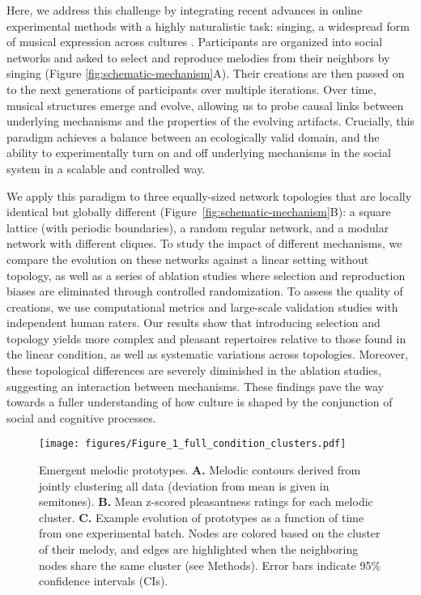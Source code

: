 \documentclass[10pt,letterpaper]{article}
\begin{document}
Here, we address this challenge by integrating recent advances in online experimental methods \cite{HarrisonMarjieh2020,anglada2023large} with a highly naturalistic task: singing, a widespread form of musical expression across cultures \cite{mehr2019universality}. Participants are organized into social networks and asked to select and reproduce melodies from their neighbors by singing (Figure \ref{fig:schematic-mechanism}A). Their creations are then passed on to the next generations of participants over multiple iterations. Over time, musical structures emerge and evolve, allowing us to probe causal links between underlying mechanisms and the properties of the evolving artifacts. Crucially, this paradigm achieves a balance between an ecologically valid domain, and the ability to experimentally turn on and off underlying mechanisms in the social system in a scalable and controlled way.

We apply this paradigm to three equally-sized network topologies that are locally identical but globally different (Figure~\ref{fig:schematic-mechanism}B): a square lattice (with periodic boundaries), a random regular network, and a modular network with different cliques. To study the impact of different mechanisms, we compare the evolution on these networks against a linear setting without topology, as well as a series of ablation studies where selection and reproduction biases are eliminated through controlled randomization. To assess the quality of creations, we use computational metrics and large-scale validation studies with independent human raters. Our results show that introducing selection and topology yields more complex and pleasant repertoires relative to those found in the linear condition, as well as systematic variations across topologies. Moreover, these topological differences are severely diminished in the ablation studies, suggesting an interaction between mechanisms. These findings pave the way towards a fuller understanding of how culture is shaped by the conjunction of social and cognitive processes.

\begin{figure*}[ht]
\begin{center}
\texttt{[image: figures/Figure\_1\_full\_condition\_clusters.pdf]}
\end{center}
\vspace{-4mm}
\caption{Emergent melodic prototypes. \textbf{A.} Melodic contours derived from jointly clustering all data (deviation from mean is given in semitones). \textbf{B.} Mean z-scored pleasantness ratings for each melodic cluster. \textbf{C.} Example evolution of prototypes as a function of time from one experimental batch. Nodes are colored based on the cluster of their melody, and edges are highlighted when the neighboring nodes share the same cluster (see Methods). Error bars indicate 95\% confidence intervals (CIs).} 
\label{fig:clusters}
\end{figure*}
\end{document}
